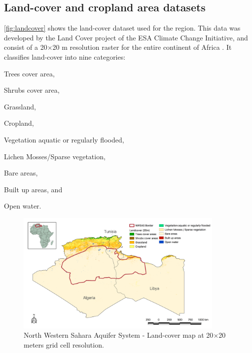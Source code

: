 \documentclass[12pt]{iopart}
\begin{document}
\subsection{Land-cover and cropland area datasets}
\autoref{fig:landcover} shows the land-cover dataset used for the region. This data was developed by the Land Cover project of the ESA Climate Change Initiative, and consist of a 20$\times$20 m resolution raster for the entire continent of Africa \cite{ESA2017}. It classifies land-cover into nine categories: \begin{enumerate*}[label=\upshape(\arabic*\upshape)]
	\item Trees cover area, 
	\item Shrubs cover area,
	\item Grassland,
	\item Cropland,
	\item Vegetation aquatic or regularly flooded,
	\item Lichen Mosses/Sparse vegetation,
	\item Bare areas,
	\item Built up areas, and
	\item Open water.
\end{enumerate*}
\begin{figure}[!h]
	\centering
	\includegraphics[width=0.9\textwidth]{NWSAS_Landcover}
	\caption[NWSAS land-cover map]{North Western Sahara Aquifer System - Land-cover map at 20$\times$20 meters grid cell resolution.}
	\label{fig:landcover}
\end{figure}
\end{document}

